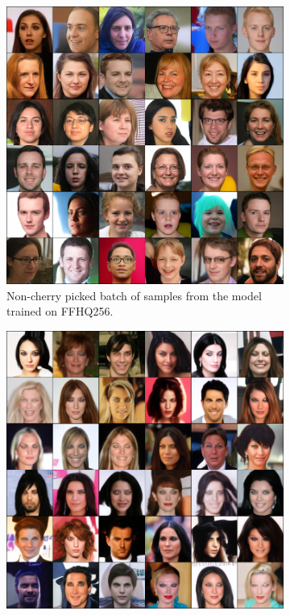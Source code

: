 \begin{figure}
    \centering
    \begin{subfigure}[b]{0.47\textwidth}
        \centering
        \includegraphics[width=1.0\textwidth]{figures/ffhq256-samples-small.png}
        \caption{
            Non-cherry picked batch of samples from the model trained on FFHQ256.
        }
    \end{subfigure}
    \hfill
    \begin{subfigure}[b]{0.47\textwidth}
        \centering
        \includegraphics[width=1.0\textwidth]{figures/celeba-samples-small.png}

\end{subfigure}
\end{figure}
